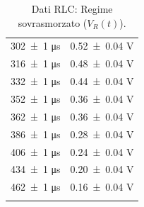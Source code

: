 \documentclass[a4paper]{article}
\begin{document}
\begin{appendices}
\begin{table}[htbp]
\begin{minipage}{0.48\textwidth}
\begin{tabular}{|c|c|}
        \num{302 \pm 1} \si{\micro\second} & \num{0.52 \pm 0.04} \si{\volt} \\ %
        \num{316 \pm 1} \si{\micro\second} & \num{0.48 \pm 0.04} \si{\volt} \\ %
        \num{332 \pm 1} \si{\micro\second} & \num{0.44 \pm 0.04} \si{\volt} \\ %
        \num{352 \pm 1} \si{\micro\second} & \num{0.36 \pm 0.04} \si{\volt} \\ %
        \num{362 \pm 1} \si{\micro\second} & \num{0.36 \pm 0.04} \si{\volt} \\ %
        \num{386 \pm 1} \si{\micro\second} & \num{0.28 \pm 0.04} \si{\volt} \\ %
        \num{406 \pm 1} \si{\micro\second} & \num{0.24 \pm 0.04} \si{\volt} \\ %
        \num{434 \pm 1} \si{\micro\second} & \num{0.20 \pm 0.04} \si{\volt} \\ %
        \num{462 \pm 1} \si{\micro\second} & \num{0.16 \pm 0.04} \si{\volt} \\ %
        \hline
        \multicolumn{2}{c}{\rule{0pt}{21.5ex}} %
        \end{tabular}
       \caption{Dati RLC: Regime sovrasmorzato ($V_R(t)$).}
       \label{tab:rlc_data_sovrasmorzato}
    \end{minipage}
\end{table}


\end{appendices}
\end{document}
